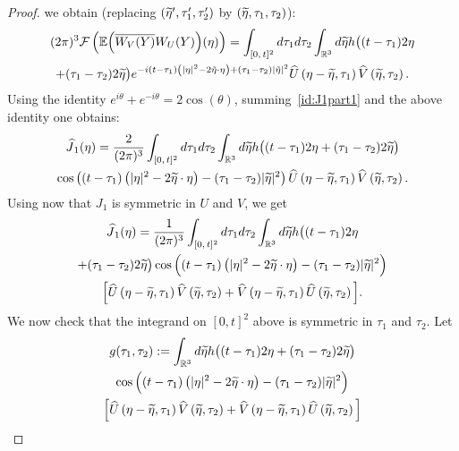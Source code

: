 \documentclass[10pt]{amsart}
\theoremstyle{definition}\newtheorem{defi}[theo]{Definition}\newtheorem{rema}[theo]{Remark}\newtheorem{exam}[theo]{Example}\newtheorem{exem}[theo]{Example}\newtheorem{nota}[theo]{Notation}
\newcommand{\R}{\mathbb{R}}
\newcommand{\E}{\mathbb{E}}
\newcommand{\mclF}{\mathcal{F}}
\let\oldtilde\tilde
\renewcommand*{\tilde}[1]{\mathchoice{\widetilde{#1}}{\widetilde{#1}}{\oldtilde{#1}}{\oldtilde{#1}}}
\let\oldhat\hat
\renewcommand*{\hat}[1]{\mathchoice{\widehat{#1}}{\widehat{#1}}{\oldhat{#1}}{\oldhat{#1}}}
\begin{document}
\begin{proof}
we obtain (replacing $(\tilde \eta',\tau_1',\tau_2')$ by $(\tilde \eta,\tau_1,\tau_2)$):
\begin{multline*}
(2\pi)^{3}\mclF \left(\E\Big(\overline{W_V(Y)} W_U(Y)\Big)(\eta)\right)
= \int_{[0,\,t]^2} d\tau_1d\tau_2\int_{\R^3} d\tilde{\eta} h\big((t-\tau_1)2\eta \\
+ (\tau_1-\tau_2) 2\tilde{\eta}\big) e^{-i(t-\tau_1)\left(|\eta|^2-2\tilde{\eta}\cdot \eta\right)+(\tau_1-\tau_2)|\tilde{\eta}|^2 }\hat U\left(\eta-\tilde{\eta},\tau_1\right) \hat V\left(\tilde{\eta},\tau_2\right).
\end{multline*}
Using the identity $e^{i\theta}+e^{-i\theta}=2\cos (\theta)$, summing~\eqref{id:J1part1} and the above identity one obtains:
\begin{multline*}
\hat J_1(\eta)=\frac{2}{(2\pi)^3} \int_{[0,\,t]^2} d\tau_1d\tau_2\int_{\R^3} d\tilde{\eta}h\big((t-\tau_1)2\eta + (\tau_1-\tau_2) 2\tilde{\eta}\big) \\
 \cos\left((t-\tau_1)\left(|\eta|^2-2\tilde{\eta}\cdot \eta\right)-(\tau_1-\tau_2)|\tilde{\eta}|^2\right)\hat U\left(\eta-\tilde{\eta},\tau_1\right) \hat V\left(\tilde{\eta},\tau_2\right).
\end{multline*}
Using now that $J_1$ is symmetric in $U$ and $V$, we get
\begin{multline*}
\hat J_1(\eta) =\frac{1}{(2\pi)^3} \int_{[0,\,t]^2}d\tau_1 d\tau_2 \int_{\R^3} d\tilde{\eta} h\big((t-\tau_1)2\eta \\
+ (\tau_1-\tau_2) 2\tilde{\eta}\big) \cos\Big((t-\tau_1)\left(|\eta|^2-2\tilde{\eta}\cdot \eta\right)-(\tau_1-\tau_2)|\tilde{\eta}|^2 \Big)\\
\Big[\hat U\left(\eta-\tilde{\eta},\tau_1\right) \hat V\left(\tilde{\eta},\tau_2\right)+ \hat V\left(\eta-\tilde{\eta},\tau_1\right) \hat U\left(\tilde{\eta},\tau_2\right)\Big].
\end{multline*}
We now check that the integrand on $[0,t]^2$ above is symmetric in $\tau_1$ and $\tau_2$. Let
\begin{multline*}
g(\tau_1,\tau_2) := \int_{\R^3} d\tilde{\eta} h\big((t-\tau_1)2\eta + (\tau_1-\tau_2) 2\tilde{\eta}\big)\\
\cos\Big((t-\tau_1)\left(|\eta|^2-2\tilde{\eta}\cdot \eta\right)-(\tau_1-\tau_2)|\tilde{\eta}|^2 \Big)\\
\Big[\hat U\left(\eta-\tilde{\eta},\tau_1\right) \hat V\left(\tilde{\eta},\tau_2\right)+ \hat V\left(\eta-\tilde{\eta},\tau_1\right) \hat U\left(\tilde{\eta},\tau_2\right)\Big]
\end{multline*}

\end{proof}
\end{document}

